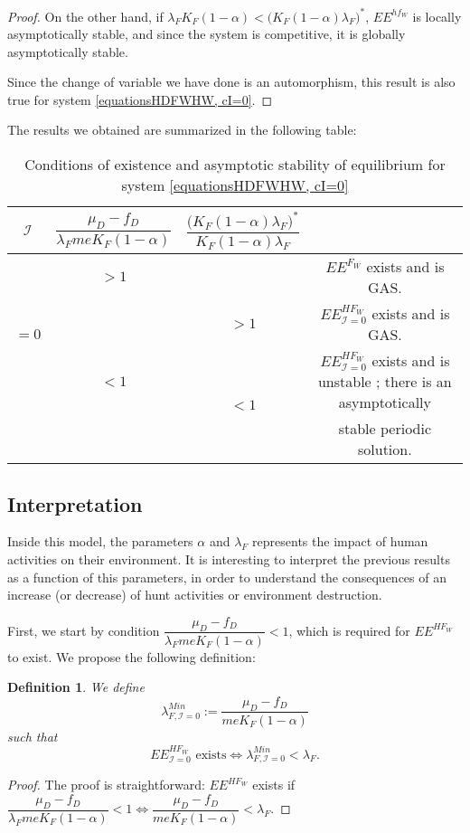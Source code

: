 \documentclass{article}
\newcommand{\lfw}{\lambda_{F}}
\newcommand{\lfw}{\lambda_{F}}
\newcommand{\cI}{\mathcal{I}}
\newtheorem{definition}{Definition}
\begin{document}
\begin{proof}
On the other hand, if $\lfw K_F(1-\alpha) < \Big(K_F(1-\alpha) \lfw \Big)^*$,  $EE^{hf_W}$ is locally asymptotically stable, and since the system is competitive, it is globally asymptotically stable.

Since the change of variable we have done is an automorphism, this result is also true for system \eqref{equationsHDFWHW, cI=0}.
\end{proof}

The results we obtained are summarized in the following table:
\begin{table}[!ht]
\centering
\def\arraystretch{2}
\begin{tabular}{c|c|c|c}
$\cI$ & $\dfrac{\mu_D - f_D}{\lfw m e K_F(1-\alpha)}$ &  $\dfrac{\Big(K_F(1-\alpha) \lfw \Big)^*}{K_F(1-\alpha) \lfw}$ & \\
\hline
\multirow{3}{*}{$=0$} & $ > 1$ & &$EE^{F_W}$ exists and is GAS.  \\
\cline{2-4}
 & \multirow{3}{*}{$< 1$} & $>1$ &$EE^{HF_W}_{\cI=0}$ exists and is GAS.\\
 \cline{3-4}
 & & \multirow{2}{*}{$ < 1$} & $EE^{HF_W}_{\cI=0}$ exists and is unstable ; there is an asymptotically \\
 & & &  stable periodic solution.
\end{tabular}
\caption{\centering Conditions of existence and asymptotic stability of equilibrium for system \eqref{equationsHDFWHW, cI=0}}
\end{table}


\subsection{Interpretation}
Inside this model, the parameters $\alpha$ and $\lfw$ represents the impact of human activities on their environment. It is interesting to interpret the previous results as a function of this parameters, in order to understand the consequences of an increase (or decrease) of hunt activities or environment destruction.

First, we start by condition $\dfrac{\mu_D - f_D}{\lfw m e K_F(1-\alpha)} < 1$, which is required for $EE^{HF_W}$ to exist. We propose the following definition:

\begin{definition}\label{defLambdaMin, cI=0} We define 
$$\lambda_{F, \cI=0}^{Min} := \dfrac{\mu_D - f_D}{m e K_F(1-\alpha)}$$
such that 
$$
\text{$EE^{HF_W}_{\cI = 0}$ exists} \Leftrightarrow \lambda_{F, \cI=0}^{Min}  <  \lfw.
$$
\end{definition}
\begin{proof}
The proof is straightforward: $EE^{HF_W}$ exists if $\dfrac{\mu_D - f_D}{\lfw m e K_F(1-\alpha)} < 1 \Leftrightarrow \dfrac{\mu_D - f_D}{ m e K_F(1-\alpha)} < \lfw$.
\end{proof}
\end{document}

